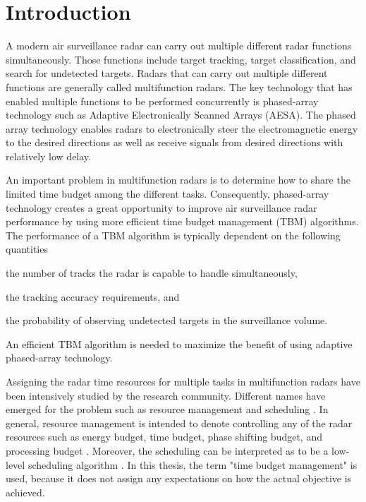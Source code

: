 \documentclass[english, 12pt, a4paper, elec, utf8, a-1b, online]{aaltothesis}
\begin{document}
\cleardoublepage

\section{Introduction}

A modern air surveillance radar can carry out multiple different radar functions simultaneously.
Those functions include target tracking, target classification, and search for undetected targets.
Radars that can carry out multiple different functions are generally called multifunction radars.
The key technology that has enabled multiple functions to be performed concurrently is phased-array technology such as
Adaptive Electronically Scanned Arrays (AESA).
The phased array technology enables radars to electronically steer the electromagnetic energy to the desired directions as well as receive signals from desired directions with relatively low delay.

An important problem in multifunction radars is to determine how to share the limited time budget among the different tasks.
Consequently, phased-array technology creates a great opportunity to improve air surveillance radar performance by using more efficient time budget management (TBM) algorithms.
The performance of a TBM algorithm is typically dependent on the following quantities 
\begin{enumerate*}[label=(\roman*)]
    \item the number of tracks the radar is capable to handle simultaneously,
    \item the tracking accuracy requirements, and
    \item the probability of observing undetected targets in the surveillance volume.
\end{enumerate*}
An efficient TBM algorithm is needed to maximize the benefit of using adaptive phased-array technology.

Assigning the radar time resources for multiple tasks in multifunction radars have been intensively studied by the research community.
Different names have emerged for the problem such as resource management \cite{Wintenby2006, Charlish2015a} and scheduling \cite{Esfahani2012, Byrne2015, Byrne2016, Krishnamurthy1999, Krishnamurthy2001}.
In general, resource management is intended to denote controlling any of the radar resources such as energy budget, time budget, phase shifting budget, and processing budget \cite{Ding2008}.
Moreover, the scheduling can be interpreted as to be a low-level scheduling algorithm \cite{Wintenby2006}.
In this thesis, the term "time budget management" is used, because it does not assign any expectations on how the actual objective is achieved.
\end{document}
